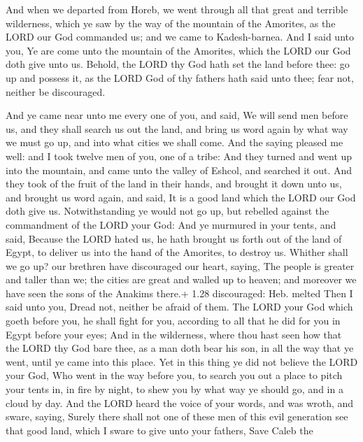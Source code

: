 And when we departed from Horeb, we went through all
that great and terrible wilderness, which ye saw by the way of the
mountain of the Amorites, as the LORD our God commanded us; and we came
to Kadesh-barnea.  And I said unto you, Ye are come unto
the mountain of the Amorites, which the LORD our God doth give unto us.
 Behold, the LORD thy God hath set the land before thee: go
up and possess it, as the LORD God of thy fathers hath said unto thee;
fear not, neither be discouraged.

 And ye came near unto me every one of you, and said, We
will send men before us, and they shall search us out the land, and
bring us word again by what way we must go up, and into what cities we
shall come.  And the saying pleased me well: and I took
twelve men of you, one of a tribe:  And they turned and
went up into the mountain, and came unto the valley of Eshcol, and
searched it out.  And they took of the fruit of the land in
their hands, and brought it down unto us, and brought us word again, and
said, It is a good land which the LORD our God doth give us.
 Notwithstanding ye would not go up, but rebelled against
the commandment of the LORD your God:  And ye murmured in
your tents, and said, Because the LORD hated us, he hath brought us
forth out of the land of Egypt, to deliver us into the hand of the
Amorites, to destroy us.  Whither shall we go up? our
brethren have discouraged our heart, saying, The people is greater and
taller than we; the cities are great and walled up to heaven; and
moreover we have seen the sons of the Anakims there.+ 1.28 discouraged:
Heb. melted  Then I said unto you, Dread not, neither be
afraid of them.  The LORD your God which goeth before you,
he shall fight for you, according to all that he did for you in Egypt
before your eyes;  And in the wilderness, where thou hast
seen how that the LORD thy God bare thee, as a man doth bear his son, in
all the way that ye went, until ye came into this place. 
Yet in this thing ye did not believe the LORD your God, 
Who went in the way before you, to search you out a place to pitch your
tents in, in fire by night, to shew you by what way ye should go, and in
a cloud by day.  And the LORD heard the voice of your
words, and was wroth, and sware, saying,  Surely there
shall not one of these men of this evil generation see that good land,
which I sware to give unto your fathers,  Save Caleb the
